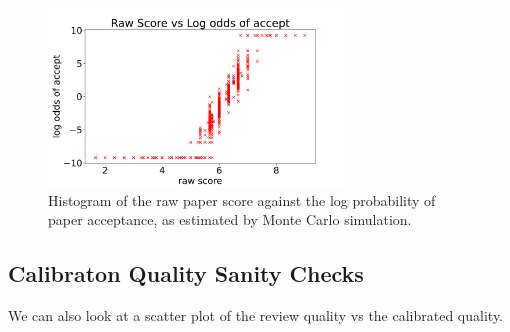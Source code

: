 \begin{figure}[htb]
\includegraphics[width=0.70\textwidth]{diagrams/neurips/raw-score-vs-log-odds.pdf}


\caption{Histogram of the raw paper score against the log probability of paper acceptance, as estimated by Monte Carlo simulation.}
\label{raw-score-vs-log-odds}
\end{figure}

\hypertarget{calibraton-quality-sanity-checks}{%
\subsection{Calibraton Quality Sanity
Checks}\label{calibraton-quality-sanity-checks}}

\begin{Shaded}
\begin{Highlighting}[]
\OperatorTok{=} 
\OperatorTok{=}
\end{Highlighting}
\end{Shaded}

We can also look at a scatter plot of the review quality vs the
calibrated quality.

\begin{Shaded}
\begin{Highlighting}[]
\OperatorTok{=}\OperatorTok{=}
\OperatorTok{=}\NormalTok{)}
\NormalTok{ax.set\_xlim([}\NormalTok{, }\NormalTok{])}
\NormalTok{)}
\NormalTok{\_ }\OperatorTok{=}\NormalTok{)}
\OperatorTok{=}\OperatorTok{=}\NormalTok{)}
\end{Highlighting}
\end{Shaded}

